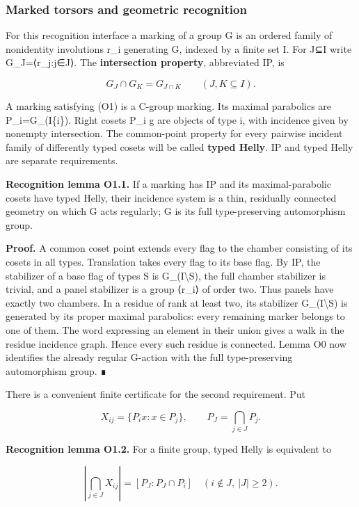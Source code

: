 \documentclass[
  10pt,
  letterpaper,
]{article}
\newcounter{none} %
\begin{document}
\subsubsection{Marked torsors and geometric
recognition}\label{marked-torsors-and-geometric-recognition}

For this recognition interface a marking of a group G is an ordered
family of nonidentity involutions r\_i generating G, indexed by a finite
set I. For J⊆I write G\_J=⟨r\_j:j∈J⟩. The \textbf{intersection
property}, abbreviated IP, is

\[
G_J\cap G_K=G_{J\cap K}\qquad(J,K\subseteq I).
\tag{O1}
\]

A marking satisfying (O1) is a C-group marking. Its maximal parabolics
are P\_i=G\_(I\{i\}). Right cosets P\_i g are objects of type i, with
incidence given by nonempty intersection. The common-point property for
every pairwise incident family of differently typed cosets will be
called \textbf{typed Helly}. IP and typed Helly are separate
requirements.

\textbf{Recognition lemma O1.1.} If a marking has IP and its
maximal-parabolic cosets have typed Helly, their incidence system is a
thin, residually connected geometry on which G acts regularly; G is its
full type-preserving automorphism group.

\textbf{Proof.} A common coset point extends every flag to the chamber
consisting of its cosets in all types. Translation takes every flag to
its base flag. By IP, the stabilizer of a base flag of types S is
G\_(I\textbackslash S), the full chamber stabilizer is trivial, and a
panel stabilizer is a group ⟨r\_i⟩ of order two. Thus panels have
exactly two chambers. In a residue of rank at least two, its stabilizer
G\_(I\textbackslash S) is generated by its proper maximal parabolics:
every remaining marker belongs to one of them. The word expressing an
element in their union gives a walk in the residue incidence graph.
Hence every such residue is connected. Lemma O0 now identifies the
already regular G-action with the full type-preserving automorphism
group. ∎

There is a convenient finite certificate for the second requirement. Put

\[
X_{ij}=\{P_i x:x\in P_j\},\qquad P_J=\bigcap_{j\in J}P_j.
\]

\textbf{Recognition lemma O1.2.} For a finite group, typed Helly is
equivalent to

\[
\left|\bigcap_{j\in J}X_{ij}\right|
 =[P_J:P_J\cap P_i]
\quad(i\notin J,\ |J|\ge2).
\tag{O2}
\]
\end{document}
